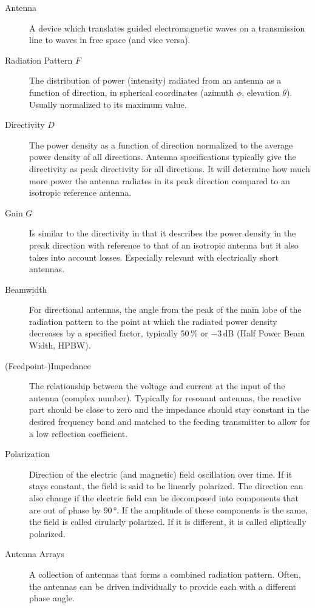
\begin{description}
\item[Antenna] A device which translates guided electromagnetic waves on a transmission line to waves in free space (and vice versa).
\item[Radiation Pattern $F$] The distribution of power (intensity) radiated from an antenna as a function of direction, in spherical coordinates (azimuth $\phi$, elevation $\theta$). Usually normalized to its maximum value.
\item[Directivity $D$] The power density as a function of direction normalized to the average power density of all directions. Antenna specifications typically give the directivity as peak directivity for all directions. It will determine how much more power the antenna radiates in its peak direction compared to an isotropic reference antenna.
\item[Gain $G$] Is similar to the directivity in that it describes the power density in the preak direction with reference to that of an isotropic antenna but it also takes into account losses. Especially relevant with electrically short antennas.
\item[Beamwidth] For directional antennas, the angle from the peak of the main lobe of the radiation pattern to the point at which the radiated power density decreases by a specified factor, typically $50\,\si{\percent}$ or $-3\,\si{\deci\bel}$ (Half Power Beam Width, HPBW).
\item[(Feedpoint-)Impedance] The relationship between the voltage and current at the input of the antenna (complex number). Typically for resonant antennas, the reactive part should be close to zero and the impedance should stay constant in the desired frequency band and matched to the feeding transmitter to allow for a low reflection coefficient.
\item[Polarization] Direction of the electric (and magnetic) field oscillation over time. If it stays constant, the field is said to be linearly polarized. The direction can also change if the electric field can be decomposed into components that are out of phase by $90\,\si{\degree}$. If the amplitude of these components is the same, the field is called cirularly polarized. If it is different, it is called eliptically polarized.
\item[Antenna Arrays] A collection of antennas that forms a combined radiation pattern. Often, the antennas can be driven individually to provide each with a different phase angle.
\end{description}

